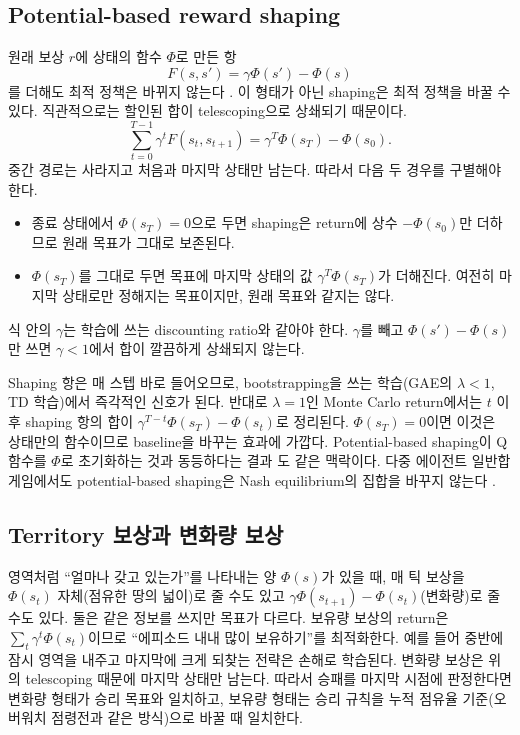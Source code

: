 \documentclass[11pt,a4paper]{article}
\begin{document}
\subsection{Potential-based reward shaping}
원래 보상 \(r\)에 상태의 함수 \(\Phi\)로 만든 항
\begin{equation}
 F(s,s')=\gamma\Phi(s')-\Phi(s)
\end{equation}
를 더해도 최적 정책은 바뀌지 않는다 \cite{ng1999}. 이 형태가 아닌 shaping은 최적 정책을 바꿀 수 있다. 직관적으로는 할인된 합이 telescoping으로 상쇄되기 때문이다.
\begin{equation}
 \sum_{t=0}^{T-1}\gamma^t F(s_t,s_{t+1})=\gamma^T\Phi(s_T)-\Phi(s_0).
\end{equation}
중간 경로는 사라지고 처음과 마지막 상태만 남는다. 따라서 다음 두 경우를 구별해야 한다.
\begin{itemize}
 \item 종료 상태에서 \(\Phi(s_T)=0\)으로 두면 shaping은 return에 상수 \(-\Phi(s_0)\)만 더하므로 원래 목표가 그대로 보존된다.
 \item \(\Phi(s_T)\)를 그대로 두면 목표에 마지막 상태의 값 \(\gamma^T\Phi(s_T)\)가 더해진다. 여전히 마지막 상태로만 정해지는 목표이지만, 원래 목표와 같지는 않다.
\end{itemize}
식 안의 \(\gamma\)는 학습에 쓰는 discounting ratio와 같아야 한다. \(\gamma\)를 빼고 \(\Phi(s')-\Phi(s)\)만 쓰면 \(\gamma<1\)에서 합이 깔끔하게 상쇄되지 않는다.

Shaping 항은 매 스텝 바로 들어오므로, bootstrapping을 쓰는 학습(GAE의 \(\lambda<1\), TD 학습)에서 즉각적인 신호가 된다. 반대로 \(\lambda=1\)인 Monte Carlo return에서는 \(t\) 이후 shaping 항의 합이 \(\gamma^{T-t}\Phi(s_T)-\Phi(s_t)\)로 정리된다. \(\Phi(s_T)=0\)이면 이것은 상태만의 함수이므로 baseline을 바꾸는 효과에 가깝다. Potential-based shaping이 Q 함수를 \(\Phi\)로 초기화하는 것과 동등하다는 결과 \cite{wiewiora2003}도 같은 맥락이다. 다중 에이전트 일반합 게임에서도 potential-based shaping은 Nash equilibrium의 집합을 바꾸지 않는다 \cite{devlin2011}.

\subsection{Territory 보상과 변화량 보상}
영역처럼 ``얼마나 갖고 있는가''를 나타내는 양 \(\Phi(s)\)가 있을 때, 매 틱 보상을 \(\Phi(s_t)\) 자체(점유한 땅의 넓이)로 줄 수도 있고 \(\gamma\Phi(s_{t+1})-\Phi(s_t)\)(변화량)로 줄 수도 있다. 둘은 같은 정보를 쓰지만 목표가 다르다. 보유량 보상의 return은 \(\sum_t\gamma^t\Phi(s_t)\)이므로 ``에피소드 내내 많이 보유하기''를 최적화한다. 예를 들어 중반에 잠시 영역을 내주고 마지막에 크게 되찾는 전략은 손해로 학습된다. 변화량 보상은 위의 telescoping 때문에 마지막 상태만 남는다. 따라서 승패를 마지막 시점에 판정한다면 변화량 형태가 승리 목표와 일치하고, 보유량 형태는 승리 규칙을 누적 점유율 기준(오버워치 점령전과 같은 방식)으로 바꿀 때 일치한다.
\end{document}
